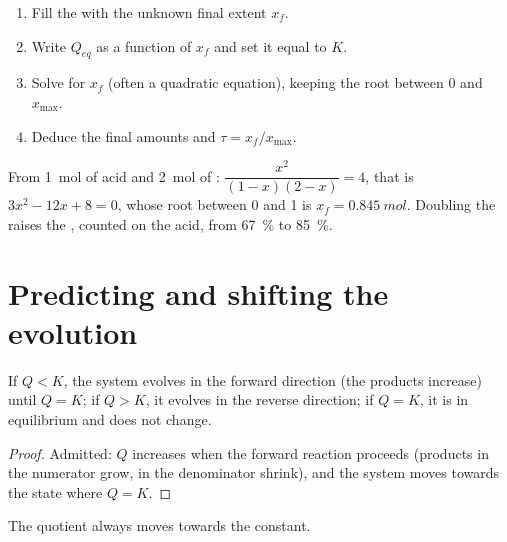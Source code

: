 \begin{method}\label{met:g12:equilibrium:final}
\begin{enumerate}
  \item Fill the  with the unknown final extent $x_f$.
  \item Write $Q_{eq}$ as a function of $x_f$ and set it equal to $K$.
  \item Solve for $x_f$ (often a quadratic equation), keeping the root
        between 0 and $x_{\max}$.
  \item Deduce the final amounts and $\tau = x_f/x_{\max}$.
\end{enumerate}
\end{method}

\begin{example}\label{ex:g12:equilibrium:excess}
From \qty{1}{mol} of acid and \qty{2}{mol} of :
$\dfrac{x^2}{(1-x)(2-x)} = 4$, that is $3x^2 - 12x + 8 = 0$, whose root
between 0 and 1 is $x_f = \qty{0.845}{mol}$. Doubling the  raises
the , counted on the acid, from \qty{67}{\percent} to
\qty{85}{\percent}.
\end{example}

\section{Predicting and shifting the evolution}

\begin{proposition}\label{prop:g12:equilibrium:direction}
If $Q < K$, the system evolves in the forward direction (the products
increase) until $Q = K$; if $Q > K$, it evolves in the reverse direction;
if $Q = K$, it is in equilibrium and does not change.
\end{proposition}

\begin{proof}
Admitted: $Q$ increases when the forward reaction proceeds (products in
the numerator grow,  in the denominator shrink), and the system
moves towards the state where $Q = K$.
\end{proof}

\begin{omfigure}

{\small The quotient always moves towards the constant.}
\end{omfigure}


